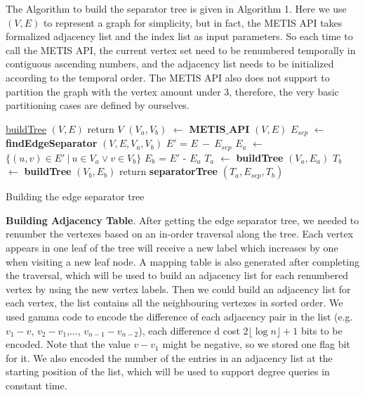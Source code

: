 \documentclass[12pt,glossary]{dalthesis}
\begin{document}
\bigskip
\bigskip

The Algorithm to build the separator tree is given in Algorithm 1. Here we use $(V,E)$
to represent a graph for simplicity, but in fact, the METIS API takes formalized adjacency list and the index list as input parameters. So each time to call the METIS API, the current vertex set need to be renumbered temporally in contiguous ascending numbers, and the adjacency list needs to be initialized according to the temporal order. The METIS API also does not support to partition the graph with the vertex amount under 3, therefore, the very basic partitioning cases are defined by ourselves.

\bigskip

\begin{algorithm}
    \underline{buildTree} $(V,E)$\;
      {
        return $V$\;
      }
      {
      	$(V_{a},V_{b})$ $\leftarrow$ \textbf{METIS$\_$API} $(V,E)$  \;
		$E_{sep}$ $\leftarrow$ \textbf{findEdgeSeparator} $(V,E,V_{a},V_{b})$ \;
		$E'$ = $E \  - \ E_{sep}$   \;
      	$E_{a}$ $\leftarrow$ $\{ (u,v) \in E' \ | \  u\in V_{a} \vee v \in V_{b} \}$ \;
		$E_{b}$ = $E'$ - $E_{a}$ \;
		$T_{a}$ $\leftarrow$ \textbf{buildTree} $(V_{a},E_{a})$ \;
		$T_{b}$ $\leftarrow$ \textbf{buildTree} $(V_{b},E_{b})$ \;  
        return \textbf{separatorTree} $(T_{a}, E_{sep}, T_{b})$ \; 
      }
    \caption{Building the edge separator tree}
\end{algorithm}
\bigskip

\textbf{Building Adjacency Table}. After getting the edge separator tree, we needed to renumber the vertexes based on an in-order traversal along the tree. Each vertex appears in one leaf of the tree will receive a new label which increases by one when visiting a new leaf node. A mapping table is also generated after completing the traversal, which will be used to build an adjacency list for each renumbered vertex by using the new vertex labels. Then we could build an adjacency list for each vertex, the list contains all the neighbouring vertexes in sorted order. We used gamma code to encode the difference of each adjacency pair in the list (e.g. $v_{1} - v$, $v_{2} - v_{1}$,..., $v_{n-1} - v_{n-2}$), each difference d cost $2\lfloor \log n \rfloor + 1$ bits to be encoded. Note that the value $v -v_{1}$ might be negative, so we stored one flag bit for it. We also encoded the number of the entries in an adjacency list at the starting position of the list, which will be used to support degree queries in constant time.
\end{document}
